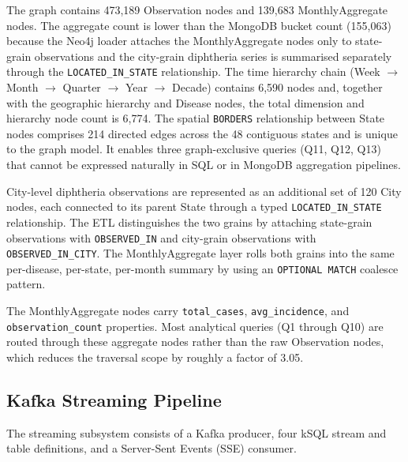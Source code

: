 \documentclass[12pt,a4paper]{article}
\begin{document}
The graph contains 473{,}189 Observation nodes and 139{,}683 MonthlyAggregate nodes. The aggregate count is lower than the MongoDB bucket count (155{,}063) because the Neo4j loader attaches the MonthlyAggregate nodes only to state-grain observations and the city-grain diphtheria series is summarised separately through the \texttt{LOCATED\_IN\_STATE} relationship. The time hierarchy chain (Week $\rightarrow$ Month $\rightarrow$ Quarter $\rightarrow$ Year $\rightarrow$ Decade) contains 6{,}590 nodes and, together with the geographic hierarchy and Disease nodes, the total dimension and hierarchy node count is 6{,}774. The spatial \texttt{BORDERS} relationship between State nodes comprises 214 directed edges across the 48 contiguous states and is unique to the graph model. It enables three graph-exclusive queries (Q11, Q12, Q13) that cannot be expressed naturally in SQL or in MongoDB aggregation pipelines.

City-level diphtheria observations are represented as an additional set of 120 City nodes, each connected to its parent State through a typed \texttt{LOCATED\_IN\_STATE} relationship. The ETL distinguishes the two grains by attaching state-grain observations with \texttt{OBSERVED\_IN} and city-grain observations with \texttt{OBSERVED\_IN\_CITY}. The MonthlyAggregate layer rolls both grains into the same per-disease, per-state, per-month summary by using an \texttt{OPTIONAL MATCH} coalesce pattern.

The MonthlyAggregate nodes carry \texttt{total\_cases}, \texttt{avg\_incidence}, and \texttt{observation\_count} properties. Most analytical queries (Q1 through Q10) are routed through these aggregate nodes rather than the raw Observation nodes, which reduces the traversal scope by roughly a factor of 3.05.

\subsection{Kafka Streaming Pipeline}

The streaming subsystem consists of a Kafka producer, four kSQL stream and table definitions, and a Server-Sent Events (SSE) consumer.
\end{document}
